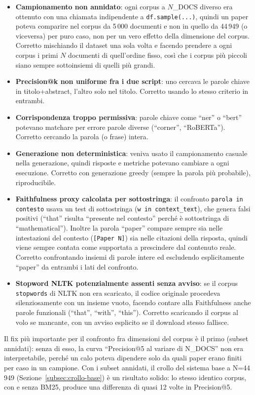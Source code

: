 \documentclass[12pt,a4paper]{article}
\begin{document}
\begin{itemize}
  \item \textbf{Campionamento non annidato}: ogni corpus a $N$\_DOCS diverso era ottenuto con una chiamata indipendente a \texttt{df.sample(...)}, quindi un paper poteva comparire nel corpus da 5\,000 documenti e non in quello da 44\,949 (o viceversa) per puro caso, non per un vero effetto della dimensione del corpus. Corretto mischiando il dataset una sola volta e facendo prendere a ogni corpus i primi $N$ documenti di quell'ordine fisso, cos\`i che i corpus pi\`u piccoli siano sempre sottoinsiemi di quelli pi\`u grandi.
  \item \textbf{Precision@k non uniforme fra i due script}: uno cercava le parole chiave in titolo+abstract, l'altro solo nel titolo. Corretto usando lo stesso criterio in entrambi.
  \item \textbf{Corrispondenza troppo permissiva}: parole chiave come ``ner'' o ``bert'' potevano matchare per errore parole diverse (``corner'', ``RoBERTa''). Corretto cercando la parola (o frase) intera.
  \item \textbf{Generazione non deterministica}: veniva usato il campionamento casuale nella generazione, quindi risposte e metriche potevano cambiare a ogni esecuzione. Corretto con generazione greedy (sempre la parola pi\`u probabile), riproducibile.
  \item \textbf{Faithfulness proxy calcolata per sottostringa}: il confronto \texttt{parola in contesto} usava un test di sottostringa (\texttt{w in context\_text}), che genera falsi positivi (``that'' risulta ``presente nel contesto'' perch\'e \`e sottostringa di ``mathematical''). Inoltre la parola ``paper'' compare sempre sia nelle intestazioni del contesto (\texttt{[Paper N]}) sia nelle citazioni della risposta, quindi viene sempre contata come supportata a prescindere dal contenuto reale. Corretto confrontando insiemi di parole intere ed escludendo esplicitamente ``paper'' da entrambi i lati del confronto.
  \item \textbf{Stopword NLTK potenzialmente assenti senza avviso}: se il corpus \texttt{stopwords} di NLTK non era scaricato, il codice originale procedeva silenziosamente con un insieme vuoto, facendo contare alla Faithfulness anche parole funzionali (``that'', ``with'', ``this''). Corretto scaricando il corpus al volo se mancante, con un avviso esplicito se il download stesso fallisce.
\end{itemize}

Il fix pi\`u importante per il confronto fra dimensioni del corpus \`e il primo (subset annidati): senza di esso, la curva ``Precision@5 al variare di N\_DOCS'' non era interpretabile, perch\'e un calo poteva dipendere solo da quali paper erano finiti per caso in un campione. Con i subset annidati, il crollo del sistema base a N=44\,949 (Sezione~\ref{subsec:crollo-base}) \`e un risultato solido: lo stesso identico corpus, con e senza BM25, produce una differenza di quasi 12 volte in Precision@5.
\end{document}
